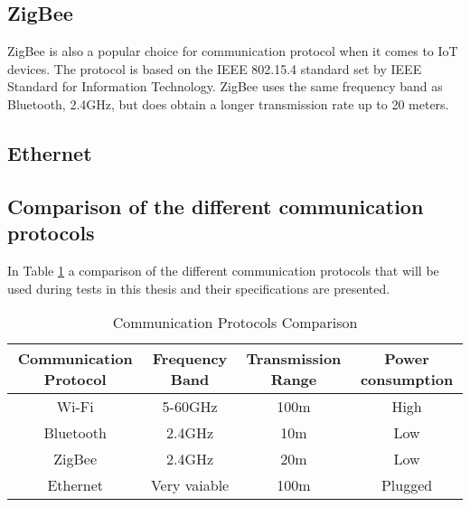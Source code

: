 \subsection*{ZigBee}
ZigBee is also a popular choice for communication protocol when it comes to IoT devices. The protocol is based on the IEEE 802.15.4 standard set by IEEE Standard for Information Technology. \cite{ZigBeeStandard} ZigBee uses the same frequency band as Bluetooth, 2.4GHz, but does obtain a longer transmission rate up to 20 meters. \cite{IAQMonitorCommunicationReview} 

\subsection*{Ethernet}

\subsection*{Comparison of the different communication protocols}
In Table \ref{CommunicationProtocolsComparison} a comparison of the different communication protocols that will be used during tests in this thesis and their specifications are presented. \\
\begin{table}[!hbtp]
\begin{tabular}{||c | c | c | c ||} 
 \hline
 Communication Protocol & Frequency Band & Transmission Range & Power consumption\\ [0.5ex]
 \hline\hline
 Wi-Fi & 5-60GHz & 100m & High\\ 
 Bluetooth & 2.4GHz & 10m & Low\\
 ZigBee & 2.4GHz & 20m & Low \\
 Ethernet & Very vaiable & 100m & Plugged\\ [1ex] 
 \hline
\end{tabular}
\caption{Communication Protocols Comparison}
\label{CommunicationProtocolsComparison}
\end{table}